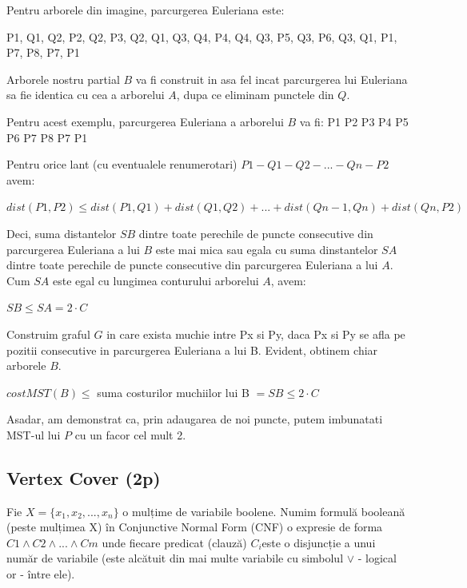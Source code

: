 \documentclass[a4paper]{article}
\begin{document}
\begin{flushleft}
Pentru arborele din imagine, parcurgerea Euleriana este:

P1, Q1, Q2, P2, Q2, P3, Q2, Q1, Q3, Q4, P4, Q4, Q3, P5, Q3, P6, Q3, Q1, P1, P7, P8, P7, P1

Arborele nostru partial $B$ va fi construit in asa fel incat parcurgerea lui Euleriana sa fie identica cu cea a arborelui $A$, dupa ce eliminam punctele din $Q$.

Pentru acest exemplu, parcurgerea Euleriana a arborelui $B$ va fi:
P1 P2 P3 P4 P5 P6 P7 P8 P7 P1

Pentru orice lant (cu eventualele renumerotari) $P1-Q1-Q2-...-Qn-P2$ avem:
\begin{center}
$dist(P1,P2) \leq dist(P1,Q1) + dist(Q1,Q2) + ... + dist(Qn-1, Qn) + dist(Qn, P2)$
\end{center}

Deci, suma distantelor $SB$ dintre toate perechile de puncte consecutive din parcurgerea Euleriana a lui $B$ este mai mica sau egala cu suma dinstantelor $SA$ dintre toate perechile de puncte consecutive din parcurgerea Euleriana a lui $A$.
Cum $SA$ este egal cu lungimea conturului arborelui $A$, avem:
\begin{center}
$SB \leq SA = 2 \cdot C$
\end{center}

Construim graful $G$ in care exista muchie intre Px si Py, daca Px si Py se afla pe pozitii consecutive in parcurgerea Euleriana a lui B. Evident, obtinem chiar arborele $B$.

\begin{center}
$cost MST(B) \leq $ suma costurilor muchiilor lui B $= SB \leq 2 \cdot C$
\end{center}

Asadar, am demonstrat ca, prin adaugarea de noi puncte, putem imbunatati MST-ul lui $P$ cu un facor cel mult 2. 


\end{flushleft}

\subsection{Vertex Cover \hfill (2p)}

Fie $X = \{ x_{1}, x_{2}, ... , x_{n} \}$ o mulțime de variabile boolene. Numim formulă booleană (peste mulțimea X) în Conjunctive Normal Form (CNF) o
expresie de forma $C1 \wedge C2 \wedge ... \wedge Cm$ unde fiecare predicat (clauză) $C_{i}$este o disjuncție a unui număr de variabile (este alcătuit din mai multe
variabile cu simbolul $\vee$ - logical or - între ele).
\end{document}
